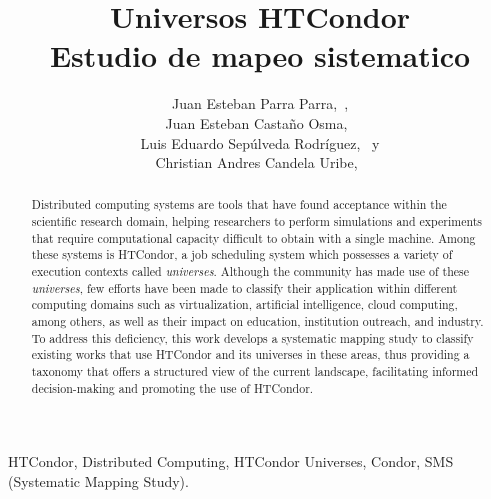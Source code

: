 \documentclass[journal]{IEEEtran}
\begin{document}
\title{
	Universos HTCondor\\
	Estudio de mapeo sistematico
}

\author{
	Juan Esteban Parra Parra,~, \\
	Juan Esteban Castaño Osma,~ \\
	Luis Eduardo Sepúlveda Rodríguez,~ y \\
	Christian Andres Candela Uribe,~
}



\maketitle
\begin{abstract}
	Distributed computing systems are tools that have found acceptance within the scientific research domain,
	helping researchers to perform simulations and experiments that require computational capacity
	difficult to obtain with a single machine. Among these systems is HTCondor, a job scheduling system which possesses a
	variety of execution contexts called \textit{universes}. Although the community has made use of these \textit{universes},
	few efforts have been made to classify their application within different computing domains such as
	virtualization, artificial intelligence, cloud computing, among others,
	as well as their impact on education, institution outreach, and industry. To address this deficiency, this
	work develops a systematic mapping study to classify existing works that use HTCondor and its universes
	in these areas, thus providing a taxonomy that offers a structured view of the current landscape,
	facilitating informed decision-making and promoting the use of HTCondor.
\end{abstract}


\begin{IEEEkeywords}
	HTCondor, Distributed Computing, HTCondor Universes, Condor, SMS (Systematic Mapping Study).
\end{IEEEkeywords}
\end{document}
